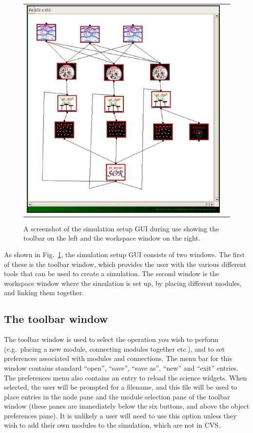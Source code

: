 \documentclass{article}
\begin{document}
\begin{figure}
\begin{tabular}{ll}
\includegraphics[width=12cm]{pics/simsetupmain.eps} \\
\end{tabular}
\caption{A screenshot of the simulation setup GUI during use showing
the toolbar on the left and the workspace window on the right.}
\label{fig:simsetup}
\end{figure}

As shown in Fig.~\ref{fig:simsetup}, the simulation setup GUI consists
of two windows.  The first of these is the toolbar window, which
provides the user with the various different tools that can be used to
create a simulation.  The second window is the workspace window where
the simulation is set up, by placing different modules, and linking
them together.

\subsection{The toolbar window}
The toolbar window is used to select the operation you wish to perform
(e.g.\ placing a new module, connecting modules together etc.), and to
set preferences associated with modules and connections.  The menu bar
for this window contains standard ``open'', ``save'', ``save as'',
``new'' and ``exit'' entries.  The preferences menu also contains an
entry to reload the science widgets.  When selected, the user will be
prompted for a filename, and this file will be used to place entries
in the node pane and the module selection pane of the toolbar window
(these panes are immediately below the six buttons, and above the
object preferences pane).  It is unlikely a user will need to use this
option unless they wish to add their own modules to the simulation,
which are not in CVS.  
\end{document}
